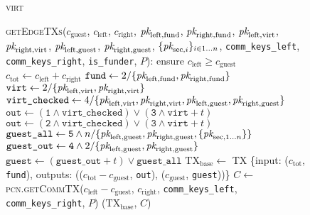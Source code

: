 \begin{figure}[H]
  \begin{processbox}{\textsc{virt}}
    \begin{algorithmic}[1]
      \State {}
      \State \textsc{getEdgeTXs}($c_{\mathrm{guest}}$, $c_{\mathrm{left}}$,
      $c_{\mathrm{right}}$, $\textit{pk}_{\mathrm{left}, \mathrm{fund}}$,
      $\textit{pk}_{\mathrm{right}, \mathrm{fund}}$, $\textit{pk}_{\mathrm{left}, \mathrm{virt}}$,
      $\textit{pk}_{\mathrm{right}, \mathrm{virt}}$, $\textit{pk}_{\mathrm{left},
      \mathrm{guest}}$, $\textit{pk}_{\mathrm{right}, \mathrm{guest}}$,
      $\{\textit{pk}_{\mathrm{sec}, i}\}_{i \in 1 \dots n}$, \texttt{comm\_keys\_left},
      \texttt{comm\_keys\_right}, \texttt{is\_funder}, $P$):
      \Indent
        \State ensure $c_{\mathrm{left}} \geq c_{\mathrm{guest}}$
        \State $c_{\mathrm{tot}} \gets c_{\mathrm{left}} + c_{\mathrm{right}}$
        \State $\texttt{fund} \gets 2/\{\textit{pk}_{\mathrm{left}, \mathrm{fund}},
        \textit{pk}_{\mathrm{right}, \mathrm{fund}}\}$
        \State $\texttt{virt} \gets 2/\{\textit{pk}_{\mathrm{left}, \mathrm{virt}},
        \textit{pk}_{\mathrm{right}, \mathrm{virt}}\}$
        \State $\texttt{virt\_checked} \gets 4/\{\textit{pk}_{\mathrm{left},
        \mathrm{virt}}, \textit{pk}_{\mathrm{right}, \mathrm{virt}}, \textit{pk}_{\mathrm{left},
        \mathrm{guest}}, \textit{pk}_{\mathrm{right}, \mathrm{guest}}\}$
          \State $\texttt{out} \gets (\texttt{1} \wedge \texttt{virt\_checked})
          \vee (\texttt{3} \wedge \texttt{virt} + t)$
        \Else \: 
          \State $\texttt{out} \gets (\texttt{2} \wedge \texttt{virt\_checked})
          \vee (\texttt{3} \wedge \texttt{virt} + t)$
        \EndIf
        \State $\texttt{guest\_all} \gets \texttt{5} \wedge
        n/\{\textit{pk}_{\mathrm{left}, \mathrm{guest}}, \textit{pk}_{\mathrm{right},
        \mathrm{guest}}, \{\textit{pk}_{\mathrm{sec}, 1 \dots n}\}\}$
        \State $\texttt{guest\_out} \gets \texttt{4} \wedge
        2/\{\textit{pk}_{\mathrm{left}, \mathrm{guest}}, \textit{pk}_{\mathrm{right},
        \mathrm{guest}}\}$
        \State $\texttt{guest} \gets (\texttt{guest\_out} + t) \vee
        \texttt{guest\_all}$
        \State $\mathrm{TX}_{\mathrm{base}} \gets$ TX \{input:
        ($c_{\mathrm{tot}}$, \texttt{fund}), outputs: (($c_{\mathrm{tot}} -
        c_{\mathrm{guest}}$, \texttt{out}), ($c_{\mathrm{guest}}$,
        \texttt{guest}))\}
        \State $C \gets$ \textsc{pcn.getCommTX}($c_{\mathrm{left}} -
        c_{\mathrm{guest}}$, $c_{\mathrm{right}}$, \texttt{comm\_keys\_left},
        \texttt{comm\_keys\_right}, $P$)
        \State \Return ($\mathrm{TX}_{\mathrm{base}}$, $C$)
      \EndIndent
    \end{algorithmic}
  \end{processbox}
  \caption{}
  \label{code:virtual-layer:edge-txs}
\end{figure}

